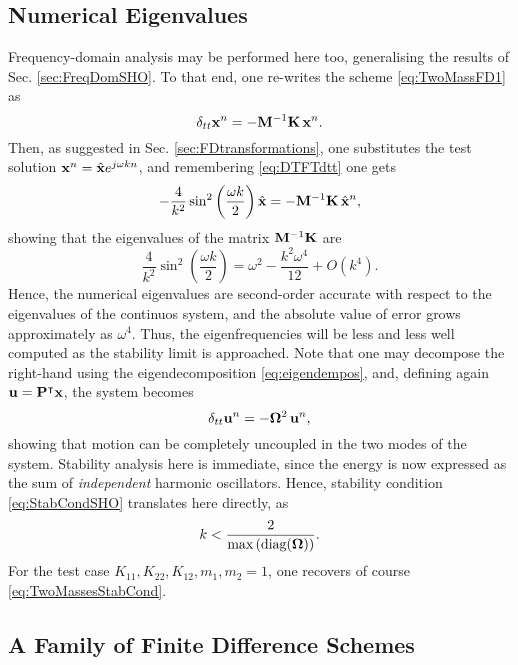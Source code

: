 \documentclass[11pt,twoside,a4paper,english]{book}
\newcommand{\dtt}{\delta_{tt}}
\begin{document}
\subsection{Numerical Eigenvalues}


Frequency-domain analysis may be performed here too, generalising the results of Sec. \ref{sec:FreqDomSHO}. To that end, one re-writes the scheme \eqref{eq:TwoMassFD1} as
\begin{equation}
\dtt {\bf x}^n = - {\bf M}^{-1}{\bf K}\, {\bf x}^n.
\end{equation}
Then, as suggested in Sec. \ref{sec:FDtransformations}, one substitutes the test solution ${\bf x}^n = \hat{\bf x}e^{j\omega kn}$, and remembering \eqref{eq:DTFTdtt} one gets
\begin{equation}
-\frac{4}{k^2}\sin^2\left( \frac{\omega k}{2}\right)\hat{\bf x} = - {\bf M}^{-1}{\bf K}\, \hat {\bf x}^n,
\end{equation}
showing that the eigenvalues of the matrix ${\bf M}^{-1}{\bf K}$ are 
\begin{equation}
\frac{4}{k^2}\sin^2\left( \frac{\omega k}{2}\right) = \omega^2 - \frac{k^2\omega^4}{12} + O(k^4).\end{equation}
Hence, the numerical eigenvalues are second-order accurate with respect to the eigenvalues of the continuos system, and  the absolute value of error grows approximately as $\omega^4$. Thus, the  eigenfrequencies will be less and less well computed as the stability limit is approached. Note that one may decompose the right-hand using the eigendecomposition \eqref{eq:eigendempos}, and, defining again  ${\bf u} = {\bf P}^{\intercal}{\bf x}$, the system becomes
\begin{equation}
\dtt {\bf u}^n = -{\bf \Omega}^2 \,{\bf u}^n,
\end{equation}
showing that motion can be completely uncoupled in the two modes of the system. Stability analysis here is immediate, since the energy is now expressed as the sum of \emph{independent} harmonic oscillators. Hence, stability condition \eqref{eq:StabCondSHO} translates here directly, as
\begin{equation}
k < \frac{2}{\text{max}\left(\text{diag}({\bf \Omega})\right)}.
\end{equation}
For the test case $K_{11},K_{22},K_{12},m_1,m_2=1$, one recovers of course \eqref{eq:TwoMassesStabCond}. 


\subsection{A Family of Finite Difference Schemes}
\end{document}
